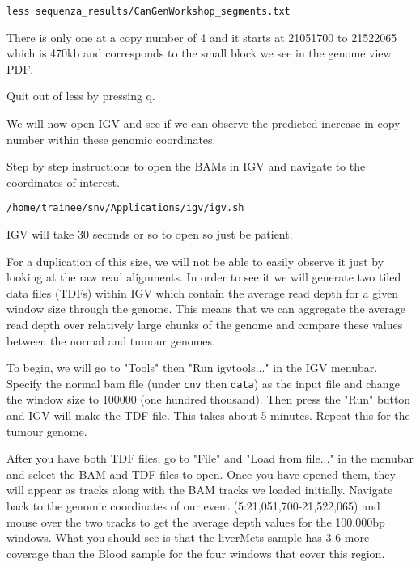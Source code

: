 \begin{steps}
\begin{lstlisting}
less sequenza_results/CanGenWorkshop_segments.txt
\end{lstlisting}
\end{steps}

There is only one at a copy number of 4 and it starts at 21051700 to 21522065 which is 470kb and corresponds to the small block we see in the genome view PDF.

Quit out of less by pressing q.

We will now open IGV and see if we can observe the predicted increase in copy number within these genomic coordinates.

\begin{steps}
Step by step instructions to open the BAMs in IGV and navigate to the coordinates of interest.

\begin{lstlisting}
/home/trainee/snv/Applications/igv/igv.sh
\end{lstlisting}
\end{steps}

IGV will take 30 seconds or so to open so just be patient.

For a duplication of this size, we will not be able to easily observe it just by looking at the raw read alignments. In order to see it we will generate two tiled data files (TDFs) within IGV which contain the average read depth for a given window size through the genome. This means that we can aggregate the average read depth over relatively large chunks of the genome and compare these values between the normal and tumour genomes.

To begin, we will go to "Tools" then "Run igvtools..." in the IGV menubar. Specify the normal bam file (under \texttt{cnv} then \texttt{data}) as the input file and change the window size to 100000 (one hundred thousand). Then press the "Run" button and IGV will make the TDF file. This takes about 5 minutes. Repeat this for the tumour genome.

After you have both TDF files, go to "File" and "Load from file..." in the menubar and select the BAM and TDF files to open. Once you have opened them, they will appear as tracks along with the BAM tracks we loaded initially. Navigate back to the genomic coordinates of our event (5:21,051,700-21,522,065) and mouse over the two tracks to get the average depth values for the 100,000bp windows. What you should see is that the liverMets sample has 3-6 more coverage than the Blood sample for the four windows that cover this region.

